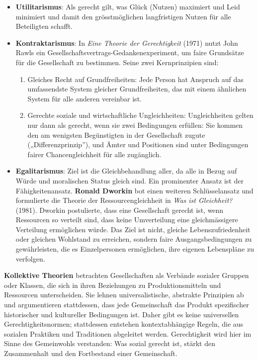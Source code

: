 \documentclass[
  nswissgerman,
  a4paper,
  DIV=11,
  numbers=noendperiod,
  oneside,
  openany]{scrreprt}
\begin{document}
\begin{tcolorbox}
\begin{itemize}
\item
  \textbf{Utilitarismus}: Als gerecht gilt, was Glück (Nutzen) maximiert
  und Leid minimiert und damit den grösstmöglichen langfristigen Nutzen
  für alle Beteiligten schafft.
\item
  \textbf{Kontraktarismus}: In \emph{Eine Theorie der Gerechtigkeit}
  (1971) nutzt John Rawls ein Gesellschaftsvertrags-Gedankenexperiment,
  um faire Grundsätze für die Gesellschaft zu bestimmen. Seine zwei
  Kernprinzipien sind:

  \begin{enumerate}
  \def\labelenumi{\arabic{enumi}.}
  \item
    Gleiches Recht auf Grundfreiheiten: Jede Person hat Anspruch auf das
    umfassendste System gleicher Grundfreiheiten, das mit einem
    ähnlichen System für alle anderen vereinbar ist.
  \item
    Gerechte soziale und wirtschaftliche Ungleichheiten: Ungleichheiten
    gelten nur dann als gerecht, wenn sie zwei Bedingungen erfüllen: Sie
    kommen den am wenigsten Begünstigten in der Gesellschaft zugute
    („Differenzprinzip''), und Ämter und Positionen sind unter
    Bedingungen fairer Chancengleichheit für alle zugänglich.
  \end{enumerate}
\item
  \textbf{Egalitarismus}: Ziel ist die Gleichbehandlung aller, da alle
  in Bezug auf Würde und moralischen Status gleich sind. Ein prominenter
  Ansatz ist der Fähigkeitenansatz. \textbf{Ronald Dworkin} bot einen
  weiteren Schlüsselansatz und formulierte die Theorie der
  Ressourcengleichheit in \emph{Was ist Gleichheit?} (1981). Dworkin
  postulierte, dass eine Gesellschaft gerecht ist, wenn Ressourcen so
  verteilt sind, dass keine Umverteilung eine gleichmässigere Verteilung
  ermöglichen würde. Das Ziel ist nicht, gleiche Lebenszufriedenheit
  oder gleichen Wohlstand zu erreichen, sondern faire
  Ausgangsbedingungen zu gewährleisten, die es Einzelpersonen
  ermöglichen, ihre eigenen Lebenspläne zu verfolgen.
\end{itemize}

\textbf{Kollektive Theorien} betrachten Gesellschaften als Verbände
sozialer Gruppen oder Klassen, die sich in ihren Beziehungen zu
Produktionsmitteln und Ressourcen unterscheiden. Sie lehnen
universalistische, abstrakte Prinzipien ab und argumentieren
stattdessen, dass jede Gemeinschaft das Produkt spezifischer
historischer und kultureller Bedingungen ist. Daher gibt es keine
universellen Gerechtigkeitsnormen; stattdessen entstehen
kontextabhängige Regeln, die aus sozialen Praktiken und Traditionen
abgeleitet werden. Gerechtigkeit wird hier im Sinne des Gemeinwohls
verstanden: Was sozial gerecht ist, stärkt den Zusammenhalt und den
Fortbestand einer Gemeinschaft.


\end{tcolorbox}
\end{document}
